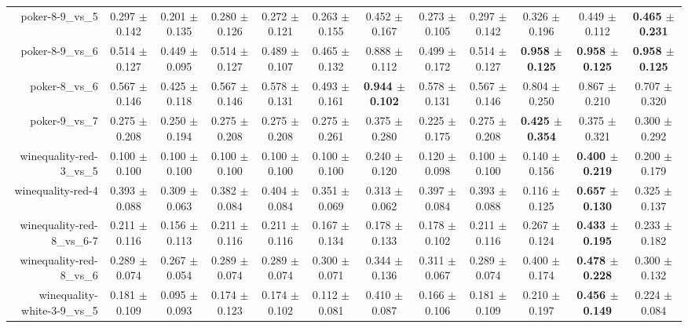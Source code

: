 \begin{table}[!ht]
{\begin{tabular}{r c c c c c c c c c c c}
poker-8-9\_vs\_5 & 0.297 $\pm$ 0.142 & 0.201 $\pm$ 0.135 & 0.280 $\pm$ 0.126 & 0.272 $\pm$ 0.121 & 0.263 $\pm$ 0.155 & 0.452 $\pm$ 0.167 & 0.273 $\pm$ 0.105 & 0.297 $\pm$ 0.142 & 0.326 $\pm$ 0.196 & 0.449 $\pm$ 0.112 & \textbf{0.465 $\pm$ 0.231} \\
poker-8-9\_vs\_6 & 0.514 $\pm$ 0.127 & 0.449 $\pm$ 0.095 & 0.514 $\pm$ 0.127 & 0.489 $\pm$ 0.107 & 0.465 $\pm$ 0.132 & 0.888 $\pm$ 0.112 & 0.499 $\pm$ 0.172 & 0.514 $\pm$ 0.127 & \textbf{0.958 $\pm$ 0.125} & \textbf{0.958 $\pm$ 0.125} & \textbf{0.958 $\pm$ 0.125} \\
poker-8\_vs\_6 & 0.567 $\pm$ 0.146 & 0.425 $\pm$ 0.118 & 0.567 $\pm$ 0.146 & 0.578 $\pm$ 0.131 & 0.493 $\pm$ 0.161 & \textbf{0.944 $\pm$ 0.102} & 0.578 $\pm$ 0.131 & 0.567 $\pm$ 0.146 & 0.804 $\pm$ 0.250 & 0.867 $\pm$ 0.210 & 0.707 $\pm$ 0.320 \\
poker-9\_vs\_7 & 0.275 $\pm$ 0.208 & 0.250 $\pm$ 0.194 & 0.275 $\pm$ 0.208 & 0.275 $\pm$ 0.208 & 0.275 $\pm$ 0.261 & 0.375 $\pm$ 0.280 & 0.225 $\pm$ 0.175 & 0.275 $\pm$ 0.208 & \textbf{0.425 $\pm$ 0.354} & 0.375 $\pm$ 0.321 & 0.300 $\pm$ 0.292 \\
winequality-red-3\_vs\_5 & 0.100 $\pm$ 0.100 & 0.100 $\pm$ 0.100 & 0.100 $\pm$ 0.100 & 0.100 $\pm$ 0.100 & 0.100 $\pm$ 0.100 & 0.240 $\pm$ 0.120 & 0.120 $\pm$ 0.098 & 0.100 $\pm$ 0.100 & 0.140 $\pm$ 0.156 & \textbf{0.400 $\pm$ 0.219} & 0.200 $\pm$ 0.179 \\
winequality-red-4 & 0.393 $\pm$ 0.088 & 0.309 $\pm$ 0.063 & 0.382 $\pm$ 0.084 & 0.404 $\pm$ 0.084 & 0.351 $\pm$ 0.069 & 0.313 $\pm$ 0.062 & 0.397 $\pm$ 0.084 & 0.393 $\pm$ 0.088 & 0.116 $\pm$ 0.125 & \textbf{0.657 $\pm$ 0.130} & 0.325 $\pm$ 0.137 \\
winequality-red-8\_vs\_6-7 & 0.211 $\pm$ 0.116 & 0.156 $\pm$ 0.113 & 0.211 $\pm$ 0.116 & 0.211 $\pm$ 0.116 & 0.167 $\pm$ 0.134 & 0.178 $\pm$ 0.133 & 0.178 $\pm$ 0.102 & 0.211 $\pm$ 0.116 & 0.267 $\pm$ 0.124 & \textbf{0.433 $\pm$ 0.195} & 0.233 $\pm$ 0.182 \\
winequality-red-8\_vs\_6 & 0.289 $\pm$ 0.074 & 0.267 $\pm$ 0.054 & 0.289 $\pm$ 0.074 & 0.289 $\pm$ 0.074 & 0.300 $\pm$ 0.071 & 0.344 $\pm$ 0.136 & 0.311 $\pm$ 0.067 & 0.289 $\pm$ 0.074 & 0.400 $\pm$ 0.174 & \textbf{0.478 $\pm$ 0.228} & 0.300 $\pm$ 0.132 \\
winequality-white-3-9\_vs\_5 & 0.181 $\pm$ 0.109 & 0.095 $\pm$ 0.093 & 0.174 $\pm$ 0.123 & 0.174 $\pm$ 0.102 & 0.112 $\pm$ 0.081 & 0.410 $\pm$ 0.087 & 0.166 $\pm$ 0.106 & 0.181 $\pm$ 0.109 & 0.210 $\pm$ 0.197 & \textbf{0.456 $\pm$ 0.149} & 0.224 $\pm$ 0.084 \\

\end{tabular}}
\end{table}
